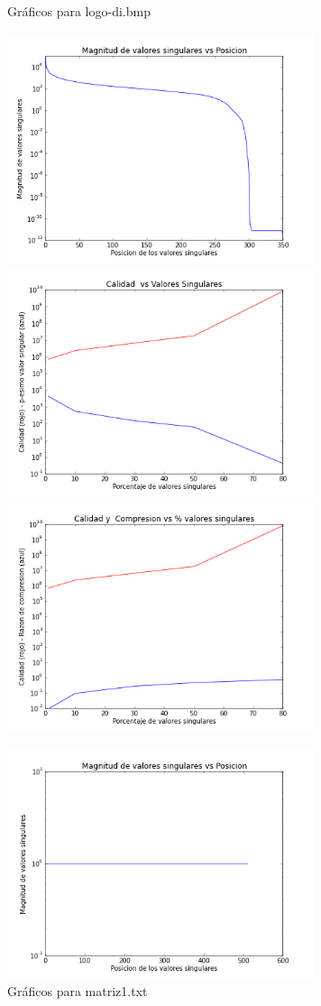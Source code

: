 \documentclass[spanish, fleqn]{article}
\begin{document}
	\begin{figure}[htbp]
		\begin{minipage}[b]{0.5\linewidth}
			\caption{Gráficos para logo-di.bmp}
			\includegraphics[width=90mm]{./Graficos/logo-di-svalue}
			\includegraphics[width=90mm]{./Graficos/logo-di-quality}
			\includegraphics[width=90mm]{./Graficos/logo-di-size}
			\label{fig:figura3}
		\end{minipage}%
		\begin{minipage}[b]{0.5\linewidth}
			\caption{Gráficos para matriz1.txt}
			\includegraphics[width=90mm]{./Graficos/matriz1-svalue}

\end{minipage}
\end{figure}
\end{document}
